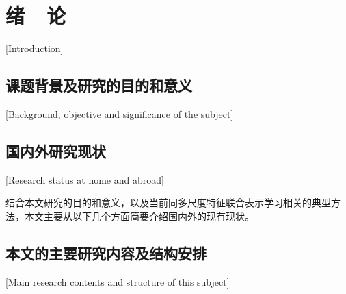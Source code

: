 
\chapter{绪~~论}[Introduction]

\section{课题背景及研究的目的和意义}[Background, objective and significance of the subject]


\section{国内外研究现状}[Research status at home and abroad]

结合本文研究的目的和意义，以及当前同多尺度特征联合表示学习相关的典型方法，本文主要从以下几个方面简要介绍国内外的现有现状。


\section{本文的主要研究内容及结构安排}[Main research contents and structure of this subject]